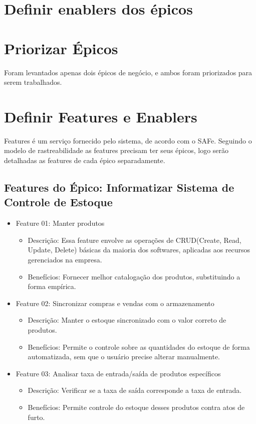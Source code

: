 \section{Definir enablers dos épicos}

\section{Priorizar Épicos}
Foram levantados apenas dois épicos de negócio, e ambos foram priorizados para serem trabalhados.

\section{Definir Features e Enablers}
Features é um serviço fornecido pelo sistema, de acordo com o SAFe. Seguindo o modelo de rastreabilidade as features precisam ter seus épicos, logo serão detalhadas as features de cada épico separadamente.

\subsection{Features do Épico: Informatizar Sistema de Controle de Estoque}

\begin{itemize}
\item Feature 01: Manter produtos
\begin{itemize}
\item Descrição: Essa feature envolve as operações de CRUD(Create, Read, Update, Delete) básicas da maioria dos softwares, aplicadas aos recursos gerenciados na empresa.
\item Benefícios: Fornecer melhor catalogação dos produtos, substituindo a forma empírica.
\end{itemize}

\item Feature 02: Sincronizar compras e vendas com o armazenamento
\begin{itemize}
    \item Descrição: Manter o estoque sincronizado com o valor correto de produtos.
    \item Benefícios: Permite o controle sobre as quantidades do estoque de forma automatizada, sem que o usuário precise alterar manualmente.
\end{itemize}


\item Feature 03: Analisar taxa de entrada/saída de produtos específicos
\begin{itemize}
	\item Descrição: Verificar se a taxa de saída corresponde a taxa de entrada.
	\item Benefícios: Permite controle do estoque desses produtos contra atos de furto.
\end{itemize}

\end{itemize}

